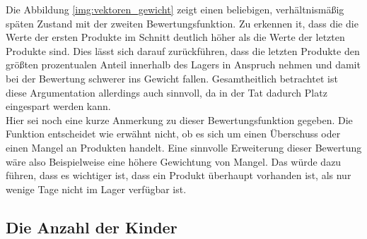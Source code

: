 \documentclass[]{scrartcl}
\begin{document}
Die Abbildung \ref{img:vektoren_gewicht} zeigt einen beliebigen, verhältnismäßig späten Zustand mit der zweiten Bewertungsfunktion. Zu erkennen it, dass die die Werte der ersten Produkte im Schnitt deutlich höher als die Werte der letzten Produkte sind. Dies lässt sich darauf zurückführen, dass die letzten Produkte den größten prozentualen Anteil innerhalb des Lagers in Anspruch nehmen und damit bei der Bewertung schwerer ins Gewicht fallen. Gesamtheitlich betrachtet ist diese Argumentation allerdings auch sinnvoll, da in der Tat dadurch Platz eingespart werden kann.\\

Hier sei noch eine kurze Anmerkung zu dieser Bewertungsfunktion gegeben. Die Funktion entscheidet wie erwähnt nicht, ob es sich um einen Überschuss oder einen Mangel an Produkten handelt. Eine sinnvolle Erweiterung dieser Bewertung wäre also Beispielweise eine höhere Gewichtung von Mangel. Das würde dazu führen, dass es wichtiger ist, dass ein Produkt überhaupt vorhanden ist, als nur wenige Tage nicht im Lager verfügbar ist.

\subsection{Die Anzahl der Kinder}
\end{document}
